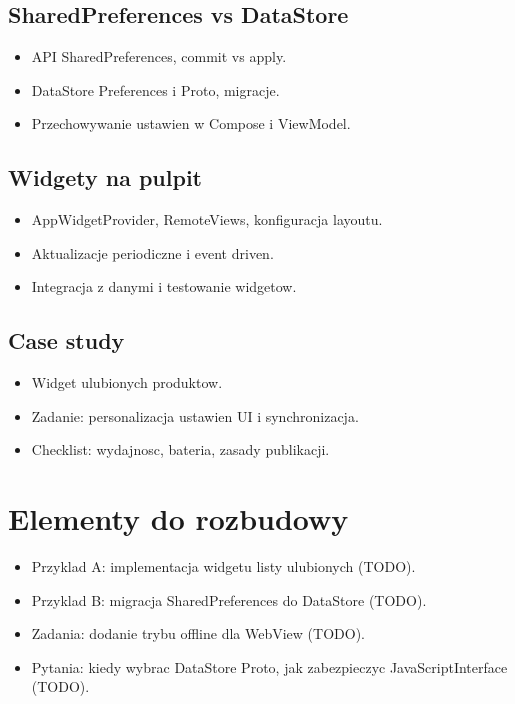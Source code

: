 \subsection{SharedPreferences vs DataStore}
\begin{itemize}
  \item API SharedPreferences, commit vs apply.
  \item DataStore Preferences i Proto, migracje.
  \item Przechowywanie ustawien w Compose i ViewModel.
\end{itemize}

\subsection{Widgety na pulpit}
\begin{itemize}
  \item AppWidgetProvider, RemoteViews, konfiguracja layoutu.
  \item Aktualizacje periodiczne i event driven.
  \item Integracja z danymi i testowanie widgetow.
\end{itemize}

\subsection{Case study}
\begin{itemize}
  \item Widget ulubionych produktow.
  \item Zadanie: personalizacja ustawien UI i synchronizacja.
  \item Checklist: wydajnosc, bateria, zasady publikacji.
\end{itemize}

\section{Elementy do rozbudowy}
\begin{itemize}
  \item Przyklad A: implementacja widgetu listy ulubionych (TODO).
  \item Przyklad B: migracja SharedPreferences do DataStore (TODO).
  \item Zadania: dodanie trybu offline dla WebView (TODO).
  \item Pytania: kiedy wybrac DataStore Proto, jak zabezpieczyc JavaScriptInterface (TODO).
\end{itemize}

